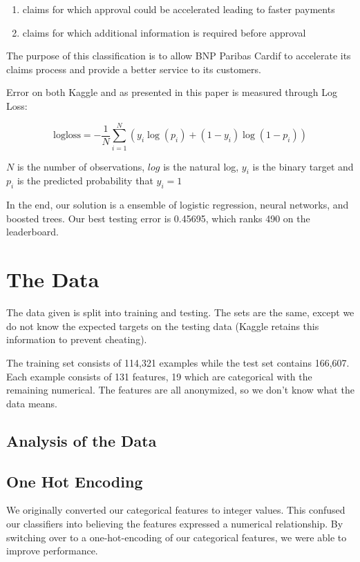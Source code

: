 \documentclass[twoside,11pt]{article}
\theoremstyle{definition}
\begin{document}
  \begin{enumerate}
    \item claims for which approval could be accelerated leading to faster payments
    \item claims for which additional information is required before approval
  \end{enumerate}

  The purpose of this classification is to allow BNP Paribas Cardif to accelerate its claims process and provide a better service to its customers.

  Error on both Kaggle and as presented in this paper is measured through Log Loss:

  \[ \text{logloss} = - \frac{1}{N} \sum\limits_{i=1}^N (y_i \log(p_i) + (1 - y_i) \log(1 - p_i)) \]

  $N$ is the number of observations, $log$ is the natural log, $y_i$ is the binary target and $p_i$ is the predicted probability that $y_i = 1$

  In the end, our solution is a ensemble of logistic regression, neural networks, and boosted trees. Our best testing error is 0.45695, which ranks 490 on the leaderboard.

\section{The Data}

  The data given is split into training and testing. The sets are the same, except we do not know the expected targets on the testing data (Kaggle retains this information to prevent cheating).

  The training set consists of 114,321 examples while the test set contains 166,607. Each example consists of 131 features, 19 which are categorical with the remaining numerical. The features are all anonymized, so we don't know what the data means.

  \subsection{Analysis of the Data}

  \subsection{One Hot Encoding}
    We originally converted our categorical features to integer values. This confused our classifiers into believing the features expressed a numerical relationship. By switching over to a one-hot-encoding of our categorical features, we were able to improve performance.
\end{document}
